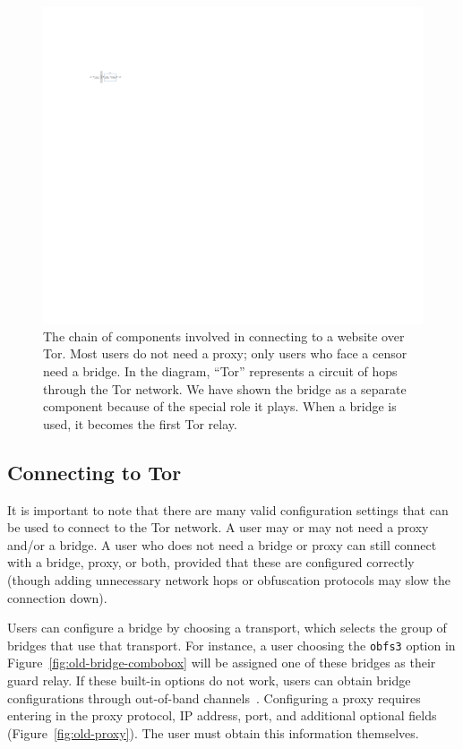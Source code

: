 \documentclass[USenglish,oneside,twocolumn]{article}
\begin{document}
\begin{figure}
\centering
\includegraphics{topology.pdf}
\caption{
The chain of components involved in connecting to a website over Tor.
Most users do not need a proxy;
only users who face a censor need a bridge.
In the diagram, ``Tor'' represents a circuit of hops through the Tor network.
We have shown the bridge as a separate component
because of the special role it plays.
When a bridge is used, it becomes the first Tor relay.
}
\label{fig:topology}
\end{figure}

\subsection{Connecting to Tor} 
It is important to note that there are many valid configuration settings that can be used to connect to the Tor network. A user may or may not need a proxy and/or a bridge.
A user who does not need a bridge or proxy can still connect with a bridge, proxy, or both, provided that these are configured correctly (though adding unnecessary network hops or obfuscation protocols may slow the connection down).

Users can configure a bridge by choosing a transport, which selects the group of bridges that use that transport.
For instance, a user choosing the \texttt{obfs3} option in Figure~\ref{fig:old-bridge-combobox} will be assigned one of these bridges as their guard relay.
If these built-in options do not work, users can obtain bridge configurations through out-of-band channels~\cite{bridgedb}.
Configuring a proxy requires entering in the proxy protocol, IP address, port, and additional optional fields (Figure~\ref{fig:old-proxy}).
The user must obtain this information themselves.
\end{document}
